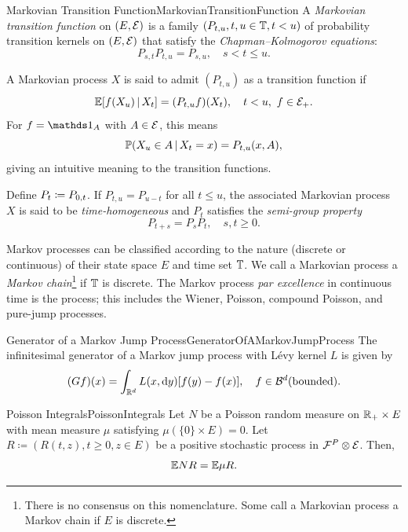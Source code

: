 \begin{defn}{Markovian Transition Function}{MarkovianTransitionFunction}
    A \emph{Markovian transition function} on $(E, \mathcal{E})$ is a family $(P_{t,u}, t, u \in \mathbb{T}, t < u)$ of probability transition kernels on $(E, \mathcal{E})$ that satisfy the \emph{Chapman--Kolmogorov equations}:
    \begin{equation}\label{eq:ChapmanKolmogorov}
        P_{s,t}P_{t,u} = P_{s,u}, \quad s < t \leq u.
    \end{equation}
\end{defn}

A Markovian process $X$ is said to admit $(P_{t,u})$ as a transition function if
\[
    \mathbb{E}[f(X_u) \,\vert\, X_t] = (P_{t,u}f)(X_t), \quad t < u, \ f \in \mathcal{E}_+.
\]
For $f = \I_A$ with $A \in \mathcal{E}$, this means
\[
    \mathbb{P}(X_u \in A \,\vert\, X_t = x) = P_{t,u}(x, A),
\]
giving an intuitive meaning to the transition functions.

Define $P_t \coloneqq P_{0,t}$. If $P_{t,u} = P_{u-t}$ for all $t \leq u$, the associated Markovian process $X$ is said to be \textit{time-homogeneous} and $P_t$ satisfies the \textit{semi-group property}
\[
    P_{t+s} = P_s P_t, \quad s, t \geq 0.
\]

Markov processes can be classified according to the nature (discrete or continuous) of their state space $E$ and time set $\mathbb{T}$. We call a Markovian process a \textit{Markov chain}\footnote{There is no consensus on this nomenclature. Some call a Markovian process a Markov chain if $E$ is discrete.} if $\mathbb{T}$ is discrete. The Markov process \textit{par excellence} in continuous time is the \Levy{} process; this includes the Wiener, Poisson, compound Poisson, and pure-jump \Levy{} processes.

\begin{thm}{Generator of a Markov Jump Process}{GeneratorOfAMarkovJumpProcess}
    The infinitesimal generator of a Markov jump process with Lévy kernel $L$ is given by
    \begin{equation}\label{eq:GeneratorMarkovJump}
        (Gf)(x) = \int_{\mathbb{R}^d} L(x, \mathrm{d} y)[f(y) - f(x)], \quad f \in \mathcal{B}^d(\mathrm{bounded}).
    \end{equation}
\end{thm}

\begin{prop}{Poisson Integrals}{PoissonIntegrals}
    Let $N$ be a Poisson random measure on $\mathbb{R}_+ \times E$ with mean measure $\mu$ satisfying $\mu(\{0\} \times E) = 0$. Let $R \coloneqq (R(t, z), t \geq 0, z \in E)$ be a positive stochastic process in $\mathcal{F}^P \otimes \mathcal{E}$. Then,
    \begin{equation}\label{eq:PoissonIntegralsExpectation}
        \mathbb{E} N R = \mathbb{E} \mu R.
    \end{equation}
\end{prop}
